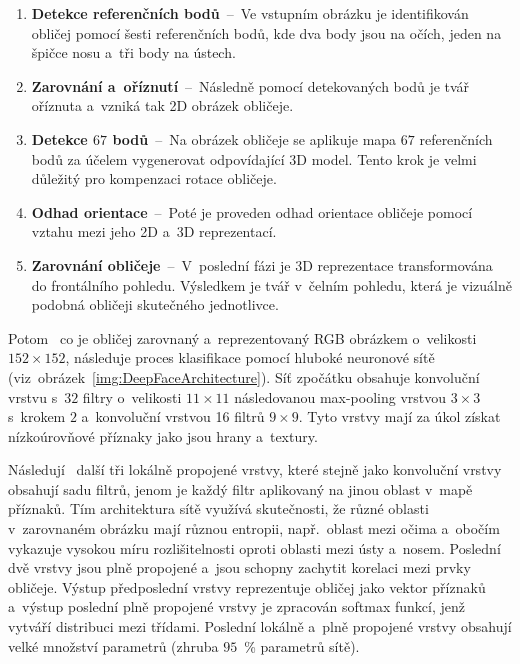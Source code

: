 \begin{enumerate}
    \item \textbf{Detekce referenčních bodů}~--~Ve vstupním obrázku je identifikován obličej pomocí šesti referenčních bodů, kde dva body jsou na očích, jeden na špičce nosu a~tři body na ústech.
    \item \textbf{Zarovnání a~oříznutí}~--~Následně pomocí detekovaných bodů je tvář oříznuta a~vzniká tak 2D obrázek obličeje.
    \item \textbf{Detekce $67$ bodů}~--~Na obrázek obličeje se aplikuje mapa $67$ referenčních bodů za účelem vygenerovat odpovídající 3D model. Tento krok je velmi důležitý pro kompenzaci rotace obličeje.
    \item \textbf{Odhad orientace}~--~Poté je proveden odhad orientace obličeje pomocí vztahu mezi jeho 2D a~3D reprezentací.
    \item \textbf{Zarovnání obličeje}~--~V~poslední fázi je 3D reprezentace transformována do frontálního pohledu. Výsledkem je tvář v~čelním pohledu, která je vizuálně podobná obličeji skutečného jednotlivce.
\end{enumerate}

Potom~\cite{website:DeepFace, article:DeepFace} co je obličej zarovnaný a~reprezentovaný RGB obrázkem o~velikosti $152 \times 152$, následuje proces klasifikace pomocí hluboké neuronové sítě (viz~obrázek~\ref{img:DeepFaceArchitecture}). Síť zpočátku obsahuje konvoluční vrstvu s~$32$ filtry o~velikosti $11 \times 11$ následovanou max-pooling vrstvou $3 \times 3$ s~krokem $2$ a~konvoluční vrstvou 16 filtrů $9 \times 9$. Tyto vrstvy mají za úkol získat nízkoúrovňové příznaky jako jsou hrany a~textury.

Následují~\cite{website:DeepFace, article:DeepFace} další tři lokálně propojené vrstvy, které stejně jako konvoluční vrstvy obsahují sadu filtrů, jenom je každý filtr aplikovaný na jinou oblast v~mapě příznaků. Tím architektura sítě využívá skutečnosti, že různé oblasti v~zarovnaném obrázku mají různou entropii, např.~oblast mezi očima a~obočím vykazuje vysokou míru rozlišitelnosti oproti oblasti mezi ústy a~nosem. Poslední dvě vrstvy jsou plně propojené a~jsou schopny zachytit korelaci mezi prvky obličeje. Výstup předposlední vrstvy reprezentuje obličej jako vektor příznaků a~výstup poslední plně propojené vrstvy je zpracován softmax funkcí, jenž vytváří distribuci mezi třídami. Poslední lokálně a~plně propojené vrstvy obsahují velké množství parametrů (zhruba $95$~\% parametrů sítě).

